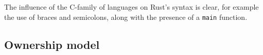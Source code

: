 The influence of the C-family of languages on Rust's syntax is clear, for example the use of braces and semicolons, along with the presence of a \texttt{main} function.







\subsection{Ownership model}
\label{ssec:rust-ownership}

